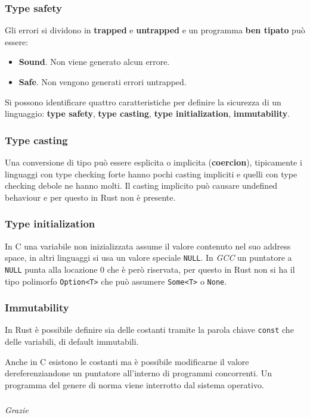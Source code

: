 \documentclass{beamer}
\newcommand{\textcode}[1]{\colorbox{backcolour}{\texttt{#1}}}
\begin{document}
\begin{frame}
    \frametitle{Type safety}
    Gli errori si dividono in \textbf{trapped} e \textbf{untrapped} e un programma \textbf{ben tipato} può essere:
    \begin{itemize}
        \item \textbf{Sound}. Non viene generato alcun errore.
        \item \textbf{Safe}. Non vengono generati errori untrapped.
    \end{itemize}
    Si possono identificare quattro caratteristiche per definire la sicurezza di un linguaggio: \textbf{type safety}, \textbf{type casting}, \textbf{type initialization}, \textbf{immutability}. 
\end{frame}

\begin{frame}
    \frametitle{Type casting}
    Una conversione di tipo può essere esplicita o implicita (\textbf{coercion}), tipicamente i linguaggi con type checking forte hanno pochi casting impliciti e quelli con type checking debole ne hanno molti.
    Il casting implicito può causare undefined behaviour e per questo in Rust non è presente. 
\end{frame}

\begin{frame}
    \frametitle{Type initialization}
    In C una variabile non inizializzata assume il valore contenuto nel suo address space, in altri linguaggi si usa un valore speciale \texttt{NULL}.
    In \textit{GCC} un puntatore a \texttt{NULL} punta alla locazione 0 che è però riservata, per questo in Rust non si ha il tipo polimorfo \textcode{Option<T>} che può assumere \textcode{Some<T>} o \textcode{None}.

    
\end{frame}

\begin{frame}
    \frametitle{Immutability}
    In Rust è possibile definire sia delle costanti tramite la parola chiave \textcode{const} che delle variabili, di default immutabili.

    Anche in C esistono le costanti ma è possibile modificarne il valore dereferenziandone un puntatore all'interno di programmi concorrenti. 
    Un programma del genere di norma viene interrotto dal sistema operativo.
    
\end{frame}

\begin{frame}
    \frametitle{}
    \centering \huge
    \emph{Grazie}
\end{frame}
\end{document}

